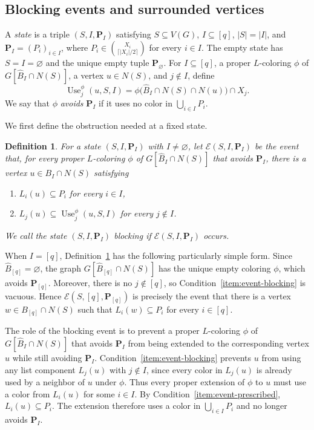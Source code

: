 \documentclass[10pt,a4paper]{amsart}
\numberwithin{equation}{section}
\newtheorem{definition}[theorem]{Definition}
\newcommand{\Use}{\operatorname{Use}}
\begin{document}
\subsection{Blocking events and surrounded vertices}\label{subsec:blocking-events}

A \emph{state} is a triple $(S,I,\mathbf{P}_I)$ satisfying
$S \subseteq V(G)$,
$I \subseteq [q]$, $|S| = |I|$, and
$\mathbf{P}_I = (P_i)_{i \in I}$, where
$P_i\in\binom{X_i}{\lceil |X_i|/2\rceil}$ for every $i\in I$.
The empty state has $S = I = \varnothing$ and the unique empty tuple
$\mathbf{P}_\varnothing$.
For $I \subseteq [q]$, a proper $L$-coloring $\phi$ of
$G[\hat{B}_{I} \cap N(S)]$, a vertex $u \in N(S)$, and $j \notin I$, define
\[
 \Use_j^\phi(u, S, I) =
 \phi\bigl(\hat{B}_{I} \cap N(S) \cap N(u)\bigr) \cap X_j.
\]
We say that $\phi$ \emph{avoids} $\mathbf{P}_I$ if it uses no color in
$\bigcup_{i \in I}P_i$.

We first define the obstruction needed at a fixed state.

\begin{definition}\label{def:blocking-events}
For a state $(S,I,\mathbf{P}_I)$ with $I \ne \varnothing$, let
$\mathcal{E}(S,I,\mathbf{P}_I)$ be the event that, for every proper
$L$-coloring $\phi$ of
$G[\hat{B}_{I} \cap N(S)]$ that avoids $\mathbf{P}_I$, there is a vertex
$u \in B_I \cap N(S)$ satisfying
\begin{enumerate}[label=(\alph*),ref=(\alph*)]
\item\label{item:event-prescribed}
$L_i(u) \subseteq P_i$ for every $i \in I$,
\item\label{item:event-blocking}
$L_j(u) \subseteq \Use_j^\phi(u, S, I)$ for every $j \notin I$.
\end{enumerate}
We call the state $(S,I,\mathbf{P}_I)$ \emph{blocking} if
$\mathcal{E}(S,I,\mathbf{P}_I)$ occurs.
\end{definition}

When $I = [q]$, Definition~\ref{def:blocking-events} has the following
particularly simple form. Since $\hat{B}_{[q]} = \varnothing$, the graph
$G[\hat{B}_{[q]} \cap N(S)]$ has the unique empty coloring $\phi$, which
avoids $\mathbf{P}_{[q]}$. Moreover, there is no $j \notin [q]$, so
Condition~\ref{item:event-blocking} is vacuous. Hence
$\mathcal{E}(S,[q],\mathbf{P}_{[q]})$ is precisely the event that there is a
vertex $w \in B_{[q]} \cap N(S)$ such that
$L_i(w) \subseteq P_i$ for every $i \in [q]$.

The role of the blocking event is to prevent a proper $L$-coloring $\phi$
of $G[\hat{B}_I\cap N(S)]$ that avoids $\mathbf{P}_I$ from being extended
to the corresponding vertex $u$ while still avoiding $\mathbf{P}_I$.
Condition~\ref{item:event-blocking} prevents $u$ from using any list
component $L_j(u)$ with $j\notin I$, since every color in $L_j(u)$ is
already used by a neighbor of $u$ under $\phi$. Thus every proper extension
of $\phi$ to $u$ must use a color from $L_i(u)$ for some $i\in I$. By
Condition~\ref{item:event-prescribed}, $L_i(u)\subseteq P_i$. The extension
therefore uses a color in $\bigcup_{i\in I}P_i$ and no longer avoids
$\mathbf{P}_I$.
 
\end{document}

